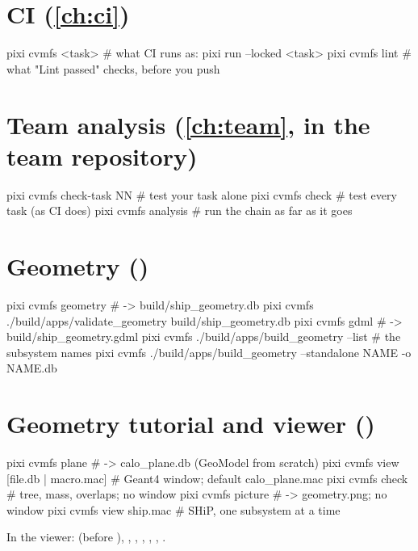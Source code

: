 \section*{CI \hfill\normalfont\small(\cref{ch:ci})}
\begin{shell}
pixi cvmfs <task>  # what CI runs as: pixi run --locked <task>
pixi cvmfs lint    # what "Lint passed" checks, before you push
\end{shell}

\section*{Team analysis \hfill\normalfont\small(\cref{ch:team}, in the team repository)}
\begin{shell}
pixi cvmfs check-task NN  # test your task alone
pixi cvmfs check          # test every task (as CI does)
pixi cvmfs analysis       # run the chain as far as it goes
\end{shell}

\section*{Geometry \hfill\normalfont\small()}
\begin{shell}
pixi cvmfs geometry                                   # -> build/ship_geometry.db
pixi cvmfs ./build/apps/validate_geometry build/ship_geometry.db
pixi cvmfs gdml                                       # -> build/ship_geometry.gdml
pixi cvmfs ./build/apps/build_geometry --list         # the subsystem names
pixi cvmfs ./build/apps/build_geometry --standalone NAME -o NAME.db
\end{shell}

\section*{Geometry tutorial and viewer \hfill\normalfont\small()}
\begin{shell}
pixi cvmfs plane                       # -> calo_plane.db (GeoModel from scratch)
pixi cvmfs view [file.db | macro.mac]  # Geant4 window; default calo_plane.mac
pixi cvmfs check                       # tree, mass, overlaps; no window
pixi cvmfs picture                     # -> geometry.png; no window
pixi cvmfs view ship.mac               # SHiP, one subsystem at a time
\end{shell}
In the viewer:  (before ),
, ,
, , ,
.

